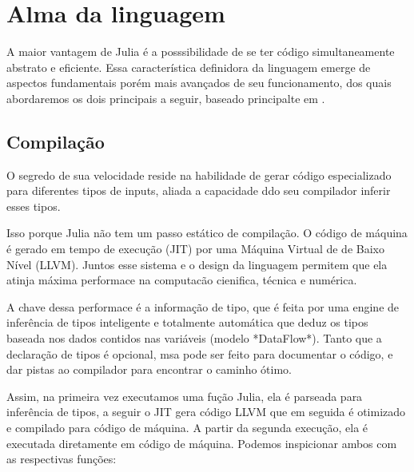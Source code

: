 %


\chapter{Alma da linguagem}
A maior vantagem de Julia é a posssibilidade de se ter código simultaneamente abstrato e eficiente. Essa característica definidora da linguagem emerge de aspectos fundamentais porém mais avançados de seu funcionamento, dos quais abordaremos os dois principais a seguir, baseado principalte em \cite{Balbaert2016} \cite{Kwong2020}.


%

\section{Compilação}
O segredo de sua velocidade reside na habilidade de gerar código especializado para diferentes tipos de inputs, aliada a capacidade ddo seu compilador inferir esses tipos. 

Isso porque Julia não tem um passo estático de compilação. O código de máquina é gerado em tempo de execução (JIT) por uma Máquina Virtual de de Baixo Nível (LLVM). Juntos esse sistema e o design da linguagem permitem que ela atinja máxima performace na computacão cienifica, técnica e numérica. %

A chave dessa performace é a informação de tipo, que é feita por uma engine de inferência de tipos inteligente e totalmente automática que deduz os tipos baseada nos dados contidos nas variáveis (modelo *DataFlow*). Tanto que a declaração de tipos é opcional, msa pode ser feito para documentar o código, e dar pistas ao compilador para encontrar o caminho ótimo. %

Assim, na primeira vez executamos uma fução Julia, ela é parseada para inferência de tipos, a seguir o JIT gera código LLVM que em seguida é otimizado e compilado para código de máquina. A partir da segunda execução, ela é executada diretamente em código de máquina. Podemos inspicionar ambos com as respectivas funções:%

